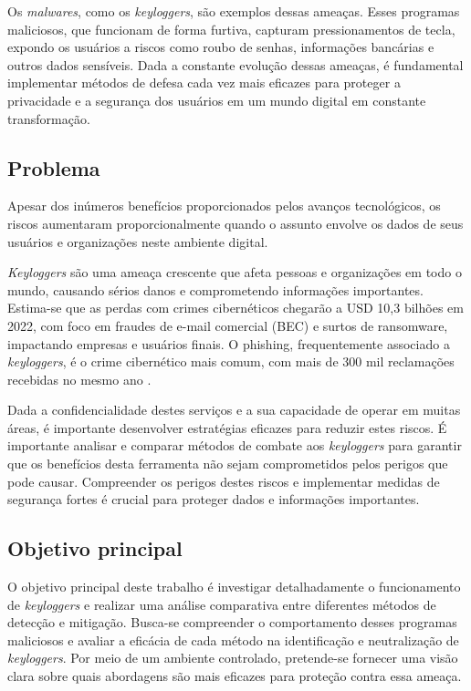 \documentclass[12pt]{article}
\begin{document}
Os \textit{malwares}, como os \textit{keyloggers}, são exemplos dessas ameaças. Esses programas maliciosos, que funcionam de forma furtiva, capturam pressionamentos de tecla, expondo os usuários a riscos como roubo de senhas, informações bancárias e outros dados sensíveis. Dada a constante evolução dessas ameaças, é fundamental implementar métodos de defesa cada vez mais eficazes para proteger a privacidade e a segurança dos usuários em um mundo digital em constante transformação.
\subsection{Problema}


Apesar dos inúmeros benefícios proporcionados pelos avanços tecnológicos, os riscos aumentaram proporcionalmente quando o assunto envolve os dados de seus usuários e organizações neste ambiente digital.

\textit{Keyloggers} são uma ameaça crescente que afeta pessoas e organizações em todo o mundo, causando sérios danos e comprometendo informações importantes. Estima-se que as perdas com crimes cibernéticos chegarão a USD 10,3 bilhões em 2022, com foco em fraudes de e-mail comercial (BEC) e surtos de ransomware, impactando empresas e usuários finais. O phishing, frequentemente associado a \textit{keyloggers}, é o crime cibernético mais comum, com mais de 300 mil reclamações recebidas no mesmo ano \citep{securityintelligence2023}.

Dada a confidencialidade destes serviços e a sua capacidade de operar em muitas áreas, é importante desenvolver estratégias eficazes para reduzir estes riscos. É importante analisar e comparar métodos de combate aos \textit{keyloggers} para garantir que os benefícios desta ferramenta não sejam comprometidos pelos perigos que pode causar. Compreender os perigos destes riscos e implementar medidas de segurança fortes é crucial para proteger dados e informações importantes.

\subsection{Objetivo principal}
O objetivo principal deste trabalho é investigar detalhadamente o funcionamento de \textit{keyloggers} e realizar uma análise comparativa entre diferentes métodos de detecção e mitigação. Busca-se compreender o comportamento desses programas maliciosos e avaliar a eficácia de cada método na identificação e neutralização de \textit{keyloggers}. Por meio de um ambiente controlado, pretende-se fornecer uma visão clara sobre quais abordagens são mais eficazes para proteção contra essa ameaça.
\end{document}
